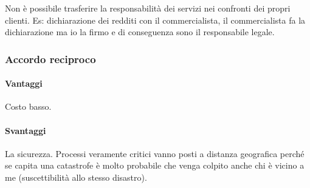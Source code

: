 Non è possibile trasferire la responsabilità dei servizi nei confronti dei 
propri clienti. Es: dichiarazione dei redditi con il commercialista, il 
commercialista fa la dichiarazione ma io la firmo e di conseguenza sono il 
responsabile legale.

\subsubsection{Accordo reciproco}

\paragraph*{Vantaggi} Costo basso. 

\paragraph*{Svantaggi}La sicurezza. Processi veramente critici vanno posti a 
distanza geografica perché se capita una catastrofe è molto probabile che venga 
colpito anche chi è vicino a me (suscettibilità allo stesso disastro).